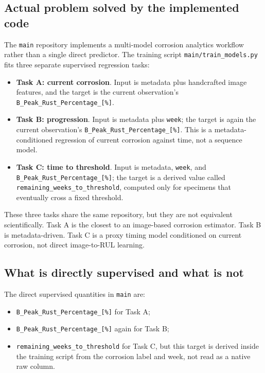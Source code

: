 \documentclass[11pt]{article}
\begin{document}
\subsection{Actual problem solved by the implemented code}
The \texttt{main} repository implements a multi-model corrosion analytics workflow rather than a single direct predictor. The training script \texttt{main/train\_models.py} fits three separate supervised regression tasks:
\begin{itemize}
  \item \textbf{Task A: current corrosion}. Input is metadata plus handcrafted image features, and the target is the current observation's \texttt{B\_Peak\_Rust\_Percentage\_[\%]}.
  \item \textbf{Task B: progression}. Input is metadata plus \texttt{week}; the target is again the current observation's \texttt{B\_Peak\_Rust\_Percentage\_[\%]}. This is a metadata-conditioned regression of current corrosion against time, not a sequence model.
  \item \textbf{Task C: time to threshold}. Input is metadata, \texttt{week}, and \texttt{B\_Peak\_Rust\_Percentage\_[\%]}; the target is a derived value called \texttt{remaining\_weeks\_to\_threshold}, computed only for specimens that eventually cross a fixed threshold.
\end{itemize}

These three tasks share the same repository, but they are not equivalent scientifically. Task A is the closest to an image-based corrosion estimator. Task B is metadata-driven. Task C is a proxy timing model conditioned on current corrosion, not direct image-to-RUL learning.

\subsection{What is directly supervised and what is not}
The direct supervised quantities in \texttt{main} are:
\begin{itemize}
  \item \texttt{B\_Peak\_Rust\_Percentage\_[\%]} for Task A;
  \item \texttt{B\_Peak\_Rust\_Percentage\_[\%]} again for Task B;
  \item \texttt{remaining\_weeks\_to\_threshold} for Task C, but this target is derived inside the training script from the corrosion label and week, not read as a native raw column.
\end{itemize}
\end{document}
